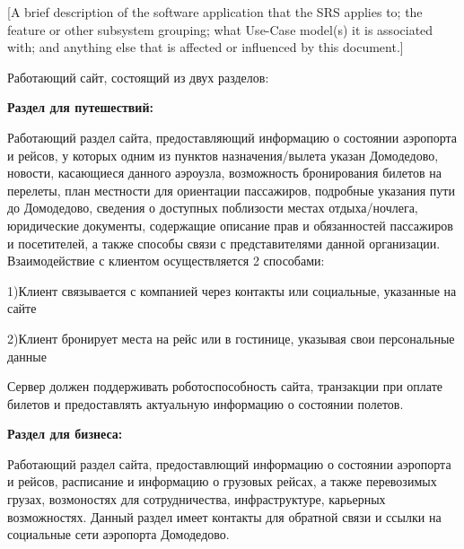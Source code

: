 [A brief description of the software application 
that the SRS applies to; the feature or other 
subsystem grouping; what Use-Case model(s) it 
is associated with;  and anything else that is 
affected or influenced by this document.]

Работающий сайт, состоящий из двух разделов:\newline

\textbf{Раздел для путешествий:}

Работающий раздел сайта, предоставляющий информацию о состоянии аэропорта и рейсов, у которых одним из пунктов назначения/вылета указан Домодедово, 
новости, касающиеся данного аэроузла, возможность бронирования билетов на перелеты, план местности для ориентации пассажиров,
подробные указания пути до Домодедово, сведения о доступных поблизости местах отдыха/ночлега, юридические документы, содержащие описание 
прав и обязанностей пассажиров и посетителей, а также способы связи с представителями данной организации.
Взаимодействие с клиентом осуществляется 2 способами:

1)Клиент связывается с компанией через контакты или социальные, указанные на сайте

2)Клиент бронирует места на рейс или в гостинице, указывая свои персональные данные

Сервер должен поддерживать роботоспособность сайта, транзакции при оплате билетов и предоставлять актуальную информацию о состоянии полетов.\newline

\textbf{Раздел для бизнеса:}

Работающий раздел сайта, предоставлющий информацию о состоянии аэропорта и рейсов, расписание и информацию о грузовых рейсах, 
а также перевозимых грузах, возмоностях для сотрудничества, инфраструктуре, карьерных возможностях. Данный раздел имеет контакты для обратной связи
и ссылки на социальные сети аэропорта Домодедово.
